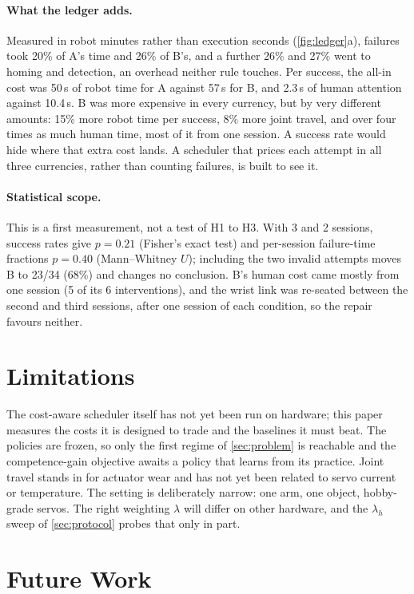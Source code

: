 \documentclass[runningheads]{llncs}
\begin{document}
\paragraph{What the ledger adds.}
Measured in robot minutes rather than execution seconds (\cref{fig:ledger}a), failures took 20\% of A's time and 26\% of B's, and a further 26\% and 27\% went to homing and detection, an overhead neither rule touches. Per success, the all-in cost was 50\,s of robot time for A against 57\,s for B, and 2.3\,s of human attention against 10.4\,s. B was more expensive in every currency, but by very different amounts: 15\% more robot time per success, 8\% more joint travel, and over four times as much human time, most of it from one session. A success rate would hide where that extra cost lands. A scheduler that prices each attempt in all three currencies, rather than counting failures, is built to see it.

\paragraph{Statistical scope.}
This is a first measurement, not a test of H1 to H3. With 3 and 2 sessions, success rates give $p = 0.21$ (Fisher's exact test) and per-session failure-time fractions $p = 0.40$ (Mann--Whitney $U$); including the two invalid attempts moves B to 23/34 (68\%) and changes no conclusion. B's human cost came mostly from one session (5 of its 6 interventions), and the wrist link was re-seated between the second and third sessions, after one session of each condition, so the repair favours neither.

\section{Limitations}
\label{sec:limitations}

The cost-aware scheduler itself has not yet been run on hardware; this paper measures the costs it is designed to trade and the baselines it must beat. The policies are frozen, so only the first regime of \cref{sec:problem} is reachable and the competence-gain objective awaits a policy that learns from its practice. Joint travel stands in for actuator wear and has not yet been related to servo current or temperature. The setting is deliberately narrow: one arm, one object, hobby-grade servos. The right weighting $\lambda$ will differ on other hardware, and the $\lambda_h$ sweep of \cref{sec:protocol} probes that only in part.

\section{Future Work}
\label{sec:future}
\end{document}
